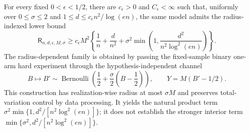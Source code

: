 For every fixed \(0<\epsilon<1/2\), there are \(c_{\epsilon}>0\) and \(C_{\epsilon}<\infty\) such that, uniformly over \(0\le\sigma\le2\) and \(1\le d\le c_{\epsilon}n^2/\log(en)\), the same model admits the radius-indexed lower bound
\[
 \mathsf R_{n,d,\epsilon,M,\sigma}
 \ge c_{\epsilon}M^2\left\{
 \frac1n+\frac d{n^2}+\sigma^2\min\left(1,\frac{d^2}{n^2\log^2(en)}\right)
 \right\}.
\]
The radius-dependent family is obtained by passing the fixed-sample binary one-arm hard experiment through the hypothesis-independent channel
\[
 B\longmapsto B'\sim\operatorname{Bernoulli}\!\left(\frac12+\frac\sigma2\left(B-\frac12\right)\right),
 \qquad Y=M(B'-1/2).
\]
This construction has realization-wise radius at most \(\sigma M\) and preserves total-variation control by data processing.  It yields the natural product term \(\sigma^2\min\{1,d^2/[n^2\log^2(en)]\}\); it does not establish the stronger interior term \(\min\{\sigma^2,d^2/[n^2\log^2(en)]\}\).
